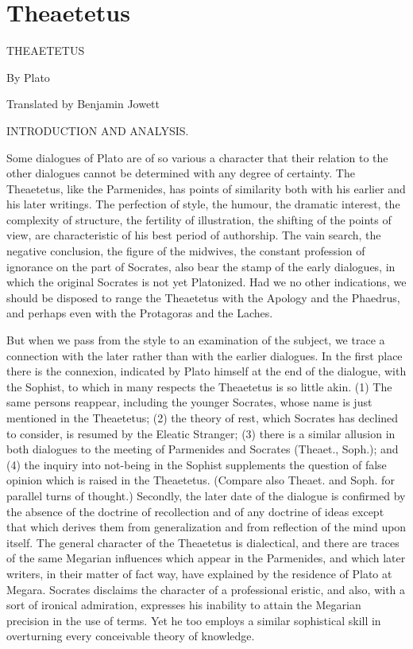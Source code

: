 \chapter{Theaetetus} %
\label{cha:theaetetus}



THEAETETUS

By Plato


Translated by Benjamin Jowett




INTRODUCTION AND ANALYSIS.

Some dialogues of Plato are of so various a character that their
relation to the other dialogues cannot be determined with any degree of
certainty. The Theaetetus, like the Parmenides, has points of similarity
both with his earlier and his later writings. The perfection of style,
the humour, the dramatic interest, the complexity of structure, the
fertility of illustration, the shifting of the points of view, are
characteristic of his best period of authorship. The vain search, the
negative conclusion, the figure of the midwives, the constant profession
of ignorance on the part of Socrates, also bear the stamp of the early
dialogues, in which the original Socrates is not yet Platonized. Had we
no other indications, we should be disposed to range the Theaetetus with
the Apology and the Phaedrus, and perhaps even with the Protagoras and
the Laches.

But when we pass from the style to an examination of the subject,
we trace a connection with the later rather than with the earlier
dialogues. In the first place there is the connexion, indicated by Plato
himself at the end of the dialogue, with the Sophist, to which in
many respects the Theaetetus is so little akin. (1) The same persons
reappear, including the younger Socrates, whose name is just mentioned
in the Theaetetus; (2) the theory of rest, which Socrates has declined
to consider, is resumed by the Eleatic Stranger; (3) there is a similar
allusion in both dialogues to the meeting of Parmenides and Socrates
(Theaet., Soph.); and (4) the inquiry into not-being in the Sophist
supplements the question of false opinion which is raised in the
Theaetetus. (Compare also Theaet. and Soph. for parallel turns of
thought.) Secondly, the later date of the dialogue is confirmed by the
absence of the doctrine of recollection and of any doctrine of ideas
except that which derives them from generalization and from reflection
of the mind upon itself. The general character of the Theaetetus is
dialectical, and there are traces of the same Megarian influences which
appear in the Parmenides, and which later writers, in their matter of
fact way, have explained by the residence of Plato at Megara. Socrates
disclaims the character of a professional eristic, and also, with a sort
of ironical admiration, expresses his inability to attain the Megarian
precision in the use of terms. Yet he too employs a similar sophistical
skill in overturning every conceivable theory of knowledge.

